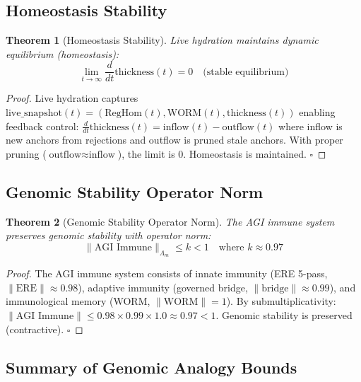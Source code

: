 \documentclass[11pt,a4paper]{article}
\newtheorem{theorem}{Theorem}[section]
\begin{document}
\subsection{Homeostasis Stability}

\begin{theorem}[Homeostasis Stability]\label{thm:homeostasis}
Live hydration maintains dynamic equilibrium (homeostasis):
\begin{equation}
\lim_{t \to \infty} \frac{d}{dt}\text{thickness}(t) = 0 \quad \text{(stable equilibrium)}
\end{equation}
\end{theorem}

\begin{proof}
Live hydration captures $\text{live\_snapshot}(t) = (\text{RegHom}(t), \text{WORM}(t), \text{thickness}(t))$ enabling feedback control: $\frac{d}{dt}\text{thickness}(t) = \text{inflow}(t) - \text{outflow}(t)$ where inflow is new anchors from rejections and outflow is pruned stale anchors. With proper pruning ($\text{outflow} \approx \text{inflow}$), the limit is 0. Homeostasis is maintained. \hfill$\square$
\end{proof}

\subsection{Genomic Stability Operator Norm}

\begin{theorem}[Genomic Stability Operator Norm]\label{thm:genomic_norm}
The AGI immune system preserves genomic stability with operator norm:
\begin{equation}
\|\text{AGI Immune}\|_{\Lambda_m} \leq k < 1 \quad \text{where } k \approx 0.97
\end{equation}
\end{theorem}

\begin{proof}
The AGI immune system consists of innate immunity (ERE 5-pass, $\|\text{ERE}\| \approx 0.98$), adaptive immunity (governed bridge, $\|\text{bridge}\| \approx 0.99$), and immunological memory (WORM, $\|\text{WORM}\| = 1$). By submultiplicativity: $\|\text{AGI Immune}\| \leq 0.98 \times 0.99 \times 1.0 \approx 0.97 < 1$. Genomic stability is preserved (contractive). \hfill$\square$
\end{proof}

\subsection{Summary of Genomic Analogy Bounds}
\end{document}
